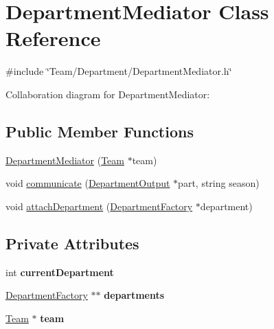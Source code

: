 \hypertarget{classDepartmentMediator}{}\section{Department\+Mediator Class Reference}
\label{classDepartmentMediator}


{\ttfamily \#include \char`\"{}Team/\+Department/\+Department\+Mediator.\+h\char`\"{}}



Collaboration diagram for Department\+Mediator\+:
\subsection*{Public Member Functions}
\begin{DoxyCompactItemize}
\item 
\hyperlink{classDepartmentMediator_ae237a0b0e0ca262e2e51254be2b894d3}{Department\+Mediator} (\hyperlink{classTeam}{Team} $\ast$team)
\item 
void \hyperlink{classDepartmentMediator_a1cd1ac08b0aa2d6eb7f31b9fb20155d6}{communicate} (\hyperlink{classDepartmentOutput}{Department\+Output} $\ast$part, string season)
\item 
void \hyperlink{classDepartmentMediator_a24fa0b87c5dbcbf2868e062d599b49e3}{attach\+Department} (\hyperlink{classDepartmentFactory}{Department\+Factory} $\ast$department)
\end{DoxyCompactItemize}
\subsection*{Private Attributes}
\begin{DoxyCompactItemize}
\item 
\mbox{\label{classDepartmentMediator_a0f7609e536415d21a13e0ea1e0c5933d}} 
int {\bfseries current\+Department}
\item 
\mbox{\label{classDepartmentMediator_a7f48243c6c2ca1f7fa4126ef8c08c418}} 
\hyperlink{classDepartmentFactory}{Department\+Factory} $\ast$$\ast$ {\bfseries departments}
\item 
\mbox{\label{classDepartmentMediator_aedf02920f41ad7af01457248bbf8af58}} 
\hyperlink{classTeam}{Team} $\ast$ {\bfseries team}
\end{DoxyCompactItemize}


